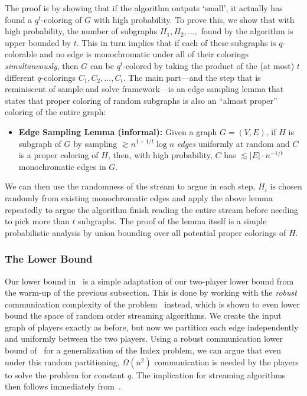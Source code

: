 \documentclass[11pt]{article}
\theoremstyle{definition}
\newcommand{\card}[1]{\left\vert{#1}\right\vert}
\begin{document}
The proof is by showing that if the algorithm outputs `small', it actually has found a $q^t$-coloring of $G$ with high probability. To prove this, we show that with high probability, 
the number of subgraphs $H_1,H_2,\ldots,$ found by the algorithm is upper bounded by $t$. This in turn implies that if each of these subgraphs is $q$-colorable and no edge is monochromatic under all of their colorings \emph{simultaneously}, 
then $G$ can be $q^t$-colored by taking the product of the (at most) $t$ different $q$-colorings $C_1,C_2,\ldots,C_t$. The main part---and the step that is reminiscent of sample and solve framework---is an edge sampling lemma
that states that proper coloring of random subgraphs is also an ``almost proper'' coloring of the entire graph: 
\begin{itemize}
	\item[] \textbf{Edge Sampling Lemma (informal):} Given a graph $G=(V,E)$, if $H$ is subgraph of $G$ by sampling $\gtrsim n^{1+1/t}\log{n}$ \emph{edges} uniformly at random and $C$ is a proper coloring of $H$,
	then, with high probability, $C$ has $\lesssim \card{E} \cdot n^{-1/t}$ monochromatic edges in $G$. 
\end{itemize}
We can then use the randomness of the stream to argue in each step, $H_i$ is chosen randomly from existing monochromatic edges and apply the above lemma repeatedly to argue the algorithm finish reading the entire stream
before needing to pick more than $t$ subgraphs. The proof of the lemma itself is a simple probabilistic analysis by union bounding over all potential proper colorings of $H$.  

\subsubsection{The Lower Bound} 

Our lower bound in~ is a simple adaptation of our two-player lower bound from the warm-up of the previous subsection. This is done by working with the \emph{robust} communication complexity of the problem~\cite{ChakrabartiCM08} instead, 
which is shown to even lower bound the space of random order streaming algorithms. We create the input graph of players exactly as before, but now we partition each edge independently and uniformly between the two players. 
Using a robust communication lower bound of~\cite{ChakrabartiCM08} for a generalization of the Index problem, 
we can argue that even under this random partitioning, $\Omega(n^2)$ communication is needed by the players to solve the problem for constant $q$. The implication for streaming algorithms then follows immediately from~\cite{ChakrabartiCM08}. 
\end{document}
